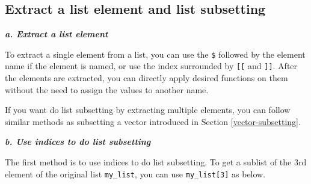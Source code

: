 \documentclass[
]{book}
\newenvironment{Shaded}{\begin{snugshade}}{\end{snugshade}}
\newcommand{\CommentTok}[1]{\textcolor[rgb]{0.56,0.35,0.01}{\textit{#1}}}
\newcommand{\DecValTok}[1]{\textcolor[rgb]{0.00,0.00,0.81}{#1}}
\newcommand{\FunctionTok}[1]{\textcolor[rgb]{0.00,0.00,0.00}{#1}}
\newcommand{\NormalTok}[1]{#1}
\newcommand{\SpecialCharTok}[1]{\textcolor[rgb]{0.00,0.00,0.00}{#1}}
\begin{document}
\hypertarget{extract-a-list-element-and-list-subsetting}{%
\subsection{Extract a list element and list subsetting}\label{extract-a-list-element-and-list-subsetting}}

\textbf{\emph{a. Extract a list element}}

To extract a single element from a list, you can use the \texttt{\$} followed by the element name if the element is named, or use the index surrounded by \texttt{{[}{[}} and \texttt{{]}{]}}. After the elements are extracted, you can directly apply desired functions on them without the need to assign the values to another name.

\begin{Shaded}
\end{Shaded}

If you want do list subsetting by extracting multiple elements, you can follow similar methods as subsetting a vector introduced in Section \ref{vector-subsetting}.

\textbf{\emph{b. Use indices to do list subsetting}}

The first method is to use indices to do list subsetting. To get a sublist of the 3rd element of the original list \texttt{my\_list}, you can use \texttt{my\_list{[}3{]}} as below.

\begin{Shaded}
\end{Shaded}
\end{document}

